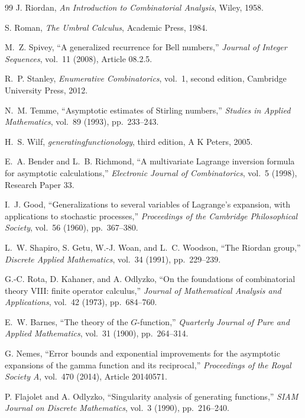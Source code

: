 \documentclass[11pt,a4paper,oneside,openany]{book}
\theoremstyle{definition}
\theoremstyle{remark}
\begin{document}
\begin{thebibliography}{99}
J. Riordan,
\emph{An Introduction to Combinatorial Analysis},
Wiley, 1958.

S. Roman,
\emph{The Umbral Calculus},
Academic Press, 1984.

M.~Z. Spivey,
``A generalized recurrence for Bell numbers,''
\emph{Journal of Integer Sequences}, vol.~11 (2008), Article 08.2.5.

R.~P. Stanley,
\emph{Enumerative Combinatorics}, vol.~1, second edition,
Cambridge University Press, 2012.

N.~M. Temme,
``Asymptotic estimates of Stirling numbers,''
\emph{Studies in Applied Mathematics}, vol.~89 (1993), pp.~233--243.

H.~S. Wilf,
\emph{generatingfunctionology}, third edition,
A K Peters, 2005.


E.~A. Bender and L.~B. Richmond,
``A multivariate Lagrange inversion formula for asymptotic calculations,''
\emph{Electronic Journal of Combinatorics}, vol.~5 (1998), Research Paper 33.

I.~J. Good,
``Generalizations to several variables of Lagrange's expansion, with applications
to stochastic processes,''
\emph{Proceedings of the Cambridge Philosophical Society}, vol.~56 (1960),
pp.~367--380.

L.~W. Shapiro, S. Getu, W.-J. Woan, and L.~C. Woodson,
``The Riordan group,''
\emph{Discrete Applied Mathematics}, vol.~34 (1991), pp.~229--239.

G.-C. Rota, D. Kahaner, and A. Odlyzko,
``On the foundations of combinatorial theory VIII: finite operator calculus,''
\emph{Journal of Mathematical Analysis and Applications}, vol.~42 (1973),
pp.~684--760.

E.~W. Barnes,
``The theory of the $G$-function,''
\emph{Quarterly Journal of Pure and Applied Mathematics}, vol.~31 (1900),
pp.~264--314.

G. Nemes,
``Error bounds and exponential improvements for the asymptotic expansions of the
gamma function and its reciprocal,''
\emph{Proceedings of the Royal Society A}, vol.~470 (2014), Article 20140571.

P. Flajolet and A. Odlyzko,
``Singularity analysis of generating functions,''
\emph{SIAM Journal on Discrete Mathematics}, vol.~3 (1990), pp.~216--240.


\end{thebibliography}
\end{document}
